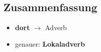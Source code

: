 \documentclass[a4paper]{article}
\begin{document}
        \subsection*{Zusammenfassung}
            \begin{itemize}
                \item \textbf{dort} $\rightarrow$ Adverb
                \item genauer: \textbf{Lokaladverb}
            \end{itemize}
\end{document}
